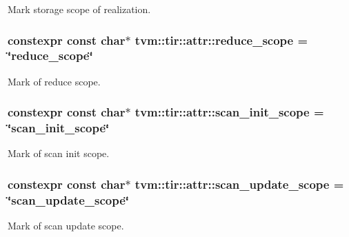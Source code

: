 Mark storage scope of realization. 

\subsubsection[{\texorpdfstring{reduce\+\_\+scope}{reduce_scope}}]{\setlength{\rightskip}{0pt plus 5cm}constexpr const char$\ast$ tvm\+::tir\+::attr\+::reduce\+\_\+scope = \char`\"{}reduce\+\_\+scope\char`\"{}}\hypertarget{namespacetvm_1_1tir_1_1attr_a50fc9633b9cfbcefa2393dbb2ece1846}{}\label{namespacetvm_1_1tir_1_1attr_a50fc9633b9cfbcefa2393dbb2ece1846}


Mark of reduce scope. 

\subsubsection[{\texorpdfstring{scan\+\_\+init\+\_\+scope}{scan_init_scope}}]{\setlength{\rightskip}{0pt plus 5cm}constexpr const char$\ast$ tvm\+::tir\+::attr\+::scan\+\_\+init\+\_\+scope = \char`\"{}scan\+\_\+init\+\_\+scope\char`\"{}}\hypertarget{namespacetvm_1_1tir_1_1attr_af18e3a9ba11d436e02b55e420647b22b}{}\label{namespacetvm_1_1tir_1_1attr_af18e3a9ba11d436e02b55e420647b22b}


Mark of scan init scope. 

\subsubsection[{\texorpdfstring{scan\+\_\+update\+\_\+scope}{scan_update_scope}}]{\setlength{\rightskip}{0pt plus 5cm}constexpr const char$\ast$ tvm\+::tir\+::attr\+::scan\+\_\+update\+\_\+scope = \char`\"{}scan\+\_\+update\+\_\+scope\char`\"{}}\hypertarget{namespacetvm_1_1tir_1_1attr_a84f5d42e968fd8f4cdd7a4aac7ba2137}{}\label{namespacetvm_1_1tir_1_1attr_a84f5d42e968fd8f4cdd7a4aac7ba2137}


Mark of scan update scope. 

